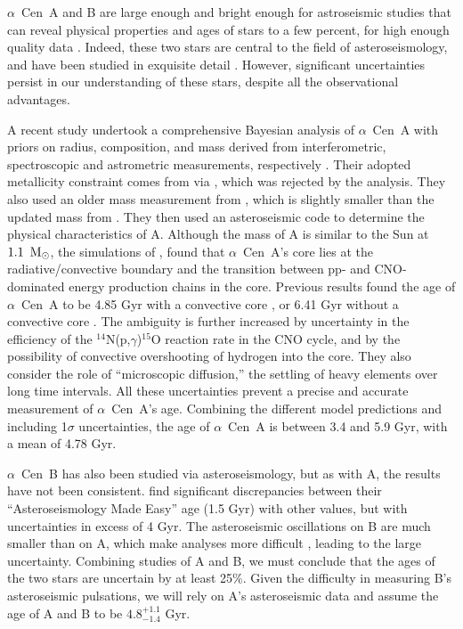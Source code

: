 \documentclass[preprint,12pt]{aastex}
\def\msun{{\rm\,M_\odot}}
\def\eg{{\it e.g.\ }}
\def\acen{{$\alpha$~Cen}}
\begin{document}
\acen~A and B are large enough and bright enough for astroseismic
studies that can reveal physical properties and ages of stars to a few
percent, for high enough quality data \citep{Chaplin2014}. Indeed, these two stars
are central to the field of asteroseismology, and have been studied in
exquisite detail \citep[e.g.][]{Bouchy01,Bouchy02}. However, significant uncertainties persist in our
understanding of these stars, despite all the observational
advantages.

A recent study undertook a comprehensive Bayesian analysis of \acen~A
with priors on radius, composition, and mass derived from
interferometric, spectroscopic and astrometric measurements,
respectively \citep{Bazot16}. Their adopted metallicity constraint
comes from \cite{NeuforgeMagain97} via \cite{Thoul03}, which was
rejected by the \cite{HinkelKane13} analysis. They also used an older
mass measurement from \cite{Pourbaix02}, which is slightly smaller
than the updated mass from \cite{PourbaixBoffin16}. They then used an
asteroseismic code to determine the physical characteristics of
A. Although the mass of A is similar to the Sun at $1.1~\msun$, the
simulations of \cite{Bazot16}, found that \acen~A's core lies at the
radiative/convective boundary and the transition between pp- and
CNO-dominated energy production chains in the core. Previous results
found the age of \acen~A to be 4.85 Gyr with a convective core
\citep{Thevenin02}, or 6.41 Gyr without a convective core
\citep{Thoul03}. The ambiguity is further increased by uncertainty in
the efficiency of the $^{14}$N(p,$\gamma$)$^{15}$O reaction rate in
the CNO cycle, and by the possibility of
convective overshooting of hydrogen into the core. They also consider
the role of ``microscopic diffusion,'' the settling of heavy
elements over long time intervals. All these uncertainties
prevent a precise and accurate measurement of \acen~A's
age. Combining the different model predictions and including 1$\sigma$
uncertainties, the age of \acen~A is between 3.4 and 5.9 Gyr,
with a mean of 4.78 Gyr.

\acen~B has also been studied via asteroseismology, but as with A, the
results have not been consistent. \cite{Lundkvist14} find significant
discrepancies between their ``Asteroseismology Made Easy'' age (1.5
Gyr) with other values, but with uncertainties in excess of 4 Gyr. The
asteroseismic oscillations on B are much smaller than on A, which make
analyses more difficult \citep[see, \eg,][]{CarrierBourban03},
leading to the large uncertainty. Combining studies of A and B, we
must conclude that the ages of the two stars are uncertain by at least
25\%. Given the difficulty in measuring B's asteroseismic pulsations,
we will rely on A's asteroseismic data and assume the age of A and B
to be $4.8^{+1.1}_{-1.4}$ Gyr.
\end{document}
